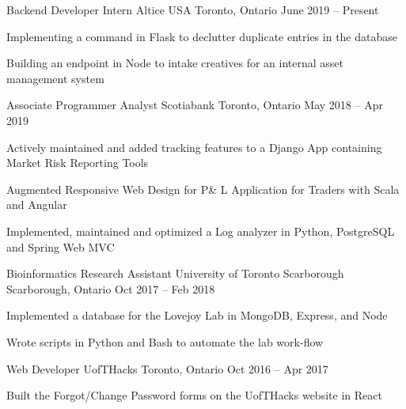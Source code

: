\begin{cventries}
  \cventry
    {Backend Developer Intern}
    {Altice USA}
    {Toronto, Ontario}
    {June 2019 -- Present}
    {
    \begin{cvitems}
      \item {Implementing a command in Flask to declutter duplicate entries in the database}
      \item {Building an endpoint in Node to intake creatives for an internal asset management system}
    \end{cvitems}
    }
  \cventry
    {Associate Programmer Analyst}
    {Scotiabank}
    {Toronto, Ontario}
    {May 2018 -- Apr 2019}
    {
      \begin{cvitems}
        \item {Actively maintained and added tracking features to a Django App containing Market Risk Reporting Tools}
        \item {Augmented Responsive Web Design for P\& L Application for Traders with Scala and Angular}
        \item {Implemented, maintained and optimized a Log analyzer in Python, PostgreSQL and Spring Web MVC}
      \end{cvitems}
    }

  \cventry
    {Bioinformatics Research Assistant}
    {University of Toronto Scarborough}
    {Scarborough, Ontario}
    {Oct 2017 -- Feb 2018}
    {
      \begin{cvitems}
        \item {Implemented a database for the Lovejoy Lab in MongoDB, Express, and Node}
        \item {Wrote scripts in Python and Bash to automate the lab work-flow}
      \end{cvitems}
    }
  \cventry
    {Web Developer}
    {UofTHacks}
    {Toronto, Ontario}
    {Oct 2016 -- Apr 2017}
    {
      \begin{cvitems}
        \item {Built the Forgot/Change Password forms on the UofTHacks website in React}
      \end{cvitems}
    }
\end{cventries}
